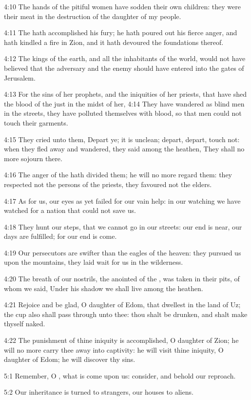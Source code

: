 4:10 The hands of the pitiful women have sodden their own children: they were their meat in the destruction of the daughter of my people.

4:11 The \LORD hath accomplished his fury; he hath poured out his fierce anger, and hath kindled a fire in Zion, and it hath devoured the foundations thereof.

4:12 The kings of the earth, and all the inhabitants of the world, would not have believed that the adversary and the enemy should have entered into the gates of Jerusalem.

4:13 For the sins of her prophets, and the iniquities of her priests, that have shed the blood of the just in the midst of her, 4:14 They have wandered as blind men in the streets, they have polluted themselves with blood, so that men could not touch their garments.

4:15 They cried unto them, Depart ye; it is unclean; depart, depart, touch not: when they fled away and wandered, they said among the heathen, They shall no more sojourn there.

4:16 The anger of the \LORD hath divided them; he will no more regard them: they respected not the persons of the priests, they favoured not the elders.

4:17 As for us, our eyes as yet failed for our vain help: in our watching we have watched for a nation that could not save us.

4:18 They hunt our steps, that we cannot go in our streets: our end is near, our days are fulfilled; for our end is come.

4:19 Our persecutors are swifter than the eagles of the heaven: they pursued us upon the mountains, they laid wait for us in the wilderness.

4:20 The breath of our nostrils, the anointed of the \LORD, was taken in their pits, of whom we said, Under his shadow we shall live among the heathen.

4:21 Rejoice and be glad, O daughter of Edom, that dwellest in the land of Uz; the cup also shall pass through unto thee: thou shalt be drunken, and shalt make thyself naked.

4:22 The punishment of thine iniquity is accomplished, O daughter of Zion; he will no more carry thee away into captivity: he will visit thine iniquity, O daughter of Edom; he will discover thy sins.

5:1 Remember, O \LORD, what is come upon us: consider, and behold our reproach.

5:2 Our inheritance is turned to strangers, our houses to aliens.

